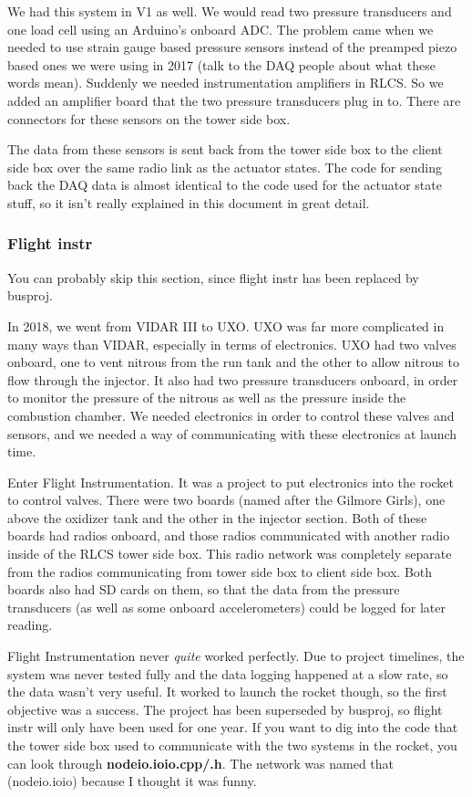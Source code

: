 \documentclass[11pt]{article}
\begin{document}
We had this system in V1 as well. We would read two pressure transducers and one
load cell using an Arduino's onboard ADC. The problem came when we needed to use
strain gauge based pressure sensors instead of the preamped piezo based ones we
were using in 2017 (talk to the DAQ people about what these words
mean). Suddenly we needed instrumentation amplifiers in RLCS. So we added an
amplifier board that the two pressure transducers plug in to. There are
connectors for these sensors on the tower side box.

The data from these sensors is sent back from the tower side box to the client
side box over the same radio link as the actuator states. The code for sending
back the DAQ data is almost identical to the code used for the actuator state
stuff, so it isn't really explained in this document in great detail.

\subsubsection{Flight instr}
\label{sec:org5ce3f6c}

You can probably skip this section, since flight instr has been replaced by
busproj.

In 2018, we went from VIDAR III to UXO. UXO was far more complicated in many
ways than VIDAR, especially in terms of electronics. UXO had two valves onboard,
one to vent nitrous from the run tank and the other to allow nitrous to flow
through the injector. It also had two pressure transducers onboard, in order to
monitor the pressure of the nitrous as well as the pressure inside the
combustion chamber. We needed electronics in order to control these valves and
sensors, and we needed a way of communicating with these electronics at launch
time.

Enter Flight Instrumentation. It was a project to put electronics into the
rocket to control valves. There were two boards (named after the Gilmore Girls),
one above the oxidizer tank and the other in the injector section. Both of these
boards had radios onboard, and those radios communicated with another radio
inside of the RLCS tower side box. This radio network was completely separate
from the radios communicating from tower side box to client side box. Both
boards also had SD cards on them, so that the data from the pressure transducers
(as well as some onboard accelerometers) could be logged for later reading.

Flight Instrumentation never \emph{quite} worked perfectly. Due to project timelines,
the system was never tested fully and the data logging happened at a slow rate,
so the data wasn't very useful. It worked to launch the rocket though, so the
first objective was a success. The project has been superseded by busproj, so
flight instr will only have been used for one year. If you want to dig into the
code that the tower side box used to communicate with the two systems in the
rocket, you can look through \textbf{nodeio.ioio.cpp/.h}. The network was named that
(nodeio.ioio) because I thought it was funny.
\end{document}
